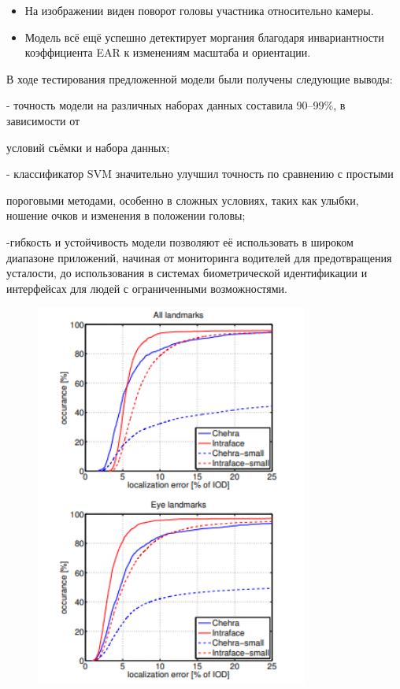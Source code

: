 \begin{itemize}
\item
  На изображении виден поворот головы участника относительно камеры.
\item
  Модель всё ещё успешно детектирует моргания благодаря инвариантности
  коэффициента EAR к изменениям масштаба и ориентации.
\end{itemize}

В ходе тестирования предложенной модели были получены следующие выводы:

- точность модели на различных наборах данных составила 90--99\%, в
зависимости от

условий съёмки и набора данных;

- классификатор SVM значительно улучшил точность по сравнению с простыми

пороговыми методами, особенно в сложных условиях, таких как улыбки,
ношение очков и изменения в положении головы;

-гибкость и устойчивость модели позволяют её использовать в широком
диапазоне приложений, начиная от мониторинга водителей для
предотвращения усталости, до использования в системах биометрической
идентификации и интерфейсах для людей с ограниченными возможностями.

\begin{figure}[H]
	\centering
	\includegraphics[width=0.8\textwidth]{media/ict/image17}
	\caption*{}
\end{figure}


